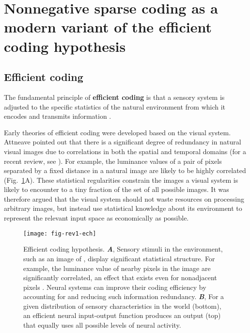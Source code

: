 \section*{Nonnegative sparse coding as a modern variant of the efficient coding hypothesis}

\subsection*{Efficient coding}

The fundamental principle of \textbf{efficient coding}
is that a sensory system is
adjusted to the specific statistics of the natural environment from which
it encodes and transmits information
\cite{Barlow1961,Attneave1954,Linsker1990,LouieGlimcher2012}.

Early theories of efficient coding
\cite{Barlow1961,Attneave1954}
were developed based on the visual system.
Attneave \cite{Attneave1954} pointed out that there is a significant
degree of redundancy in natural visual images due to correlations in both
the spatial and temporal domains
(for a recent review, see \cite{SimoncelliOlshausen2001}).
For example, the luminance values of a pair of pixels
separated by a fixed distance in a natural image
are likely to be highly correlated
(Fig.~\ref{fig:ech}A).
These statistical regularities constrain the images a visual system
is likely to encounter to a tiny fraction of the set of all
possible images.
It was therefore argued that the visual system should not
waste resources on processing arbitrary images,
but instead use statistical knowledge
about its environment to represent the relevant input space 
as economically as possible.


\begin{figure}[h]
	\centering
	\texttt{[image: fig-rev1-ech]}
    \caption{Efficient coding hypothesis.
    \textbf{\emph{A}},
         Sensory stimuli in the environment, such as an image of ,
         display significant statistical structure. For example, the luminance
         value of nearby pixels in the image are significantly correlated,
         an effect that exists even for nonadjacent pixels .
         Neural systems can improve their coding efficiency by accounting
         for and reducing such information redundancy.
     \textbf{\emph{B}},
         For a given distribution of sensory characteristics in the world (bottom),
         an efficient neural input-output function produces an output (top)
         that equally uses all possible levels of neural activity.
    }
	\label{fig:ech}
\end{figure}


